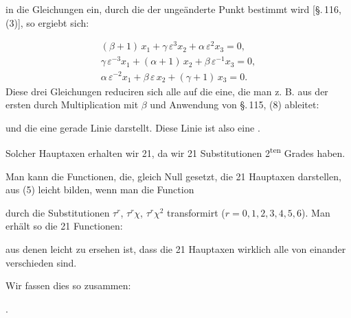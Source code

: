 in die Gleichungen ein, durch die der unge\"anderte Punkt bestimmt wird [\S.\,116, (3)], so ergiebt sich:

\[
\begin{array}{l}
(\beta+1)\,x_1 + \gamma\,\varepsilon^3 x_2 + \alpha\,\varepsilon^2 x_3 = 0,\\
\gamma\,\varepsilon^{-3} x_1 + (\alpha+1)\,x_2 + \beta\,\varepsilon^{-1} x_3 = 0,\\
\alpha\,\varepsilon^{-2} x_1 + \beta\,\varepsilon\, x_2 + (\gamma+1)\,x_3 = 0.
\end{array}
\]
Diese drei Gleichungen reduciren sich alle auf die eine, die man z. B. aus der ersten durch Multiplication mit $\beta$ und Anwendung von \S.\,115, (8) ableitet:

und die eine gerade Linie darstellt. Diese Linie ist also eine .

Solcher Hauptaxen erhalten wir 21, da wir 21 Substitutionen 2\textsuperscript{ten} Grades haben.

Man kann die Functionen, die, gleich Null gesetzt, die 21 Hauptaxen darstellen, aus (5) leicht bilden, wenn man die Function

durch die Substitutionen $\tau^r$, $\tau^r\chi$, $\tau^r\chi^2$ transformirt ($r = 0, 1, 2, 3, 4, 5, 6$). Man erh\"alt so die 21 Functionen:

aus denen leicht zu ersehen ist, dass die 21 Hauptaxen wirklich alle von einander verschieden sind.

Wir fassen dies so zusammen:

.\ 

